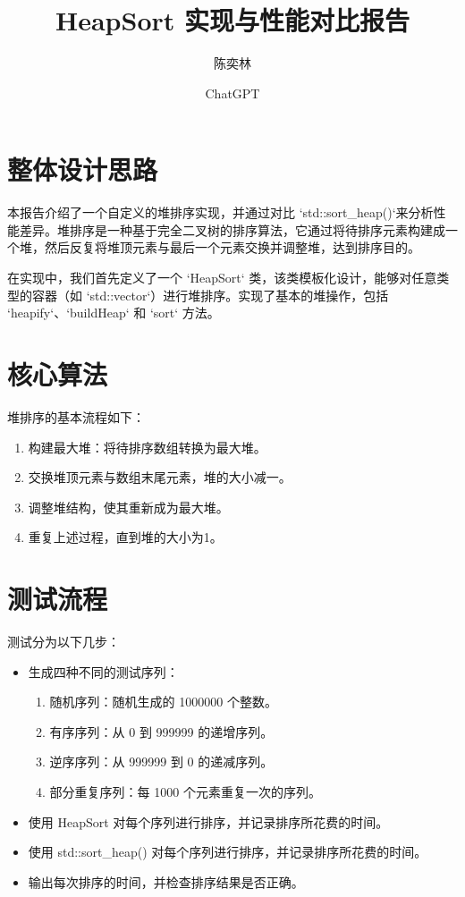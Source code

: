 \documentclass{article}
\title{HeapSort 实现与性能对比报告}
\author{陈奕林 \and ChatGPT}
\begin{document}
	\maketitle
	
	\section{整体设计思路}
	本报告介绍了一个自定义的堆排序实现，并通过对比 `std::sort\_heap()`来分析性能差异。堆排序是一种基于完全二叉树的排序算法，它通过将待排序元素构建成一个堆，然后反复将堆顶元素与最后一个元素交换并调整堆，达到排序目的。
	
	在实现中，我们首先定义了一个 `HeapSort` 类，该类模板化设计，能够对任意类型的容器（如 `std::vector`）进行堆排序。实现了基本的堆操作，包括 `heapify`、`buildHeap` 和 `sort` 方法。
	
	\section{核心算法}
	堆排序的基本流程如下：
	\begin{enumerate}
		\item 构建最大堆：将待排序数组转换为最大堆。
		\item 交换堆顶元素与数组末尾元素，堆的大小减一。
		\item 调整堆结构，使其重新成为最大堆。
		\item 重复上述过程，直到堆的大小为1。
	\end{enumerate}
	
	\section{测试流程}
	测试分为以下几步：
	
	\begin{itemize}
		\item 生成四种不同的测试序列：
		\begin{enumerate}
			\item 随机序列：随机生成的 1000000 个整数。
			\item 有序序列：从 0 到 999999 的递增序列。
			\item 逆序序列：从 999999 到 0 的递减序列。
			\item 部分重复序列：每 1000 个元素重复一次的序列。
		\end{enumerate}
		\item 使用 HeapSort 对每个序列进行排序，并记录排序所花费的时间。
		\item 使用 std::sort\_heap() 对每个序列进行排序，并记录排序所花费的时间。
		\item 输出每次排序的时间，并检查排序结果是否正确。
	\end{itemize}
	
\end{document}
